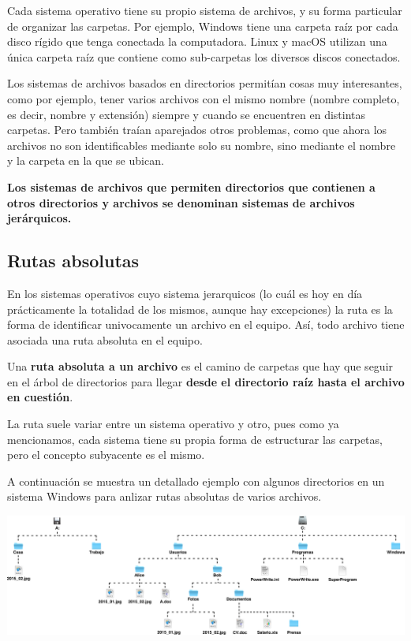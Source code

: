 Cada sistema operativo tiene su propio sistema de archivos, y su forma particular
de organizar las carpetas. Por ejemplo, Windows tiene una carpeta raíz por cada
disco rígido que tenga conectada la computadora. Linux y macOS utilizan una
única carpeta raíz que contiene como sub-carpetas los diversos discos conectados.

Los sistemas de archivos basados en directorios permitían cosas muy interesantes,
como por ejemplo, tener varios archivos con el mismo nombre (nombre completo,
es decir, nombre y extensión) siempre y cuando se encuentren en distintas
carpetas. Pero también traían aparejados otros problemas, como que ahora los
archivos no son identificables mediante solo su nombre, sino mediante el nombre
y la carpeta en la que se ubican.

\textbf{Los sistemas de archivos que permiten directorios que contienen a otros
directorios y archivos se denominan sistemas de archivos jerárquicos.}

\subsection{Rutas absolutas}

En los sistemas operativos cuyo sistema jerarquicos (lo cuál es hoy en día
prácticamente la totalidad de los mismos, aunque hay excepciones) la ruta es la
forma de identificar univocamente un archivo en el equipo. Así, todo archivo tiene
asociada una ruta absoluta en el equipo.

\begin{definition}
    Una \textbf{ruta absoluta a un archivo} es el camino de carpetas que hay que
    seguir en el árbol de directorios para llegar \textbf{desde el directorio raíz
    hasta el archivo en cuestión}.\autocite[vid.]{foldoc_absolute_2018}
\end{definition}

La ruta suele variar entre un sistema operativo y otro, pues como ya mencionamos,
cada sistema tiene su propia forma de estructurar las carpetas, pero el concepto
subyacente es el mismo.

A continuación se muestra un detallado ejemplo con algunos directorios en un
sistema Windows para anlizar rutas absolutas de varios archivos.

\vspace{0.5cm}
\centerline{\includegraphics[scale=0.35]{capitulos/informatica/imagenes/directorios_windows_1.png}}

